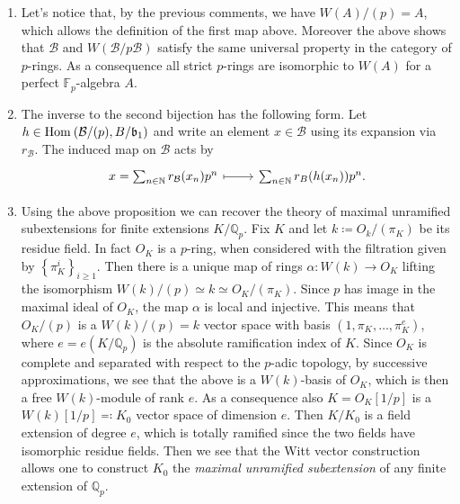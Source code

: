 \begin{rem}[]\leavevmode\vspace{-.2\baselineskip}
\begin{enumerate}
\item Let's notice that, by the previous comments, we have
	$W(A)/ (p) = A$, which allows the definition of the first map above.
	Moreover the above shows that $\mathcal{B}$ and $W(\mathcal{B}/p \mathcal{B})$
	satisfy the same universal property in the category of $p$-rings.
	As a consequence all strict $p$-rings are isomorphic to $W(A)$ for
	a perfect $\mathbb{F}_p$-algebra $A$.

\item The inverse to the second bijection has the following form.
	Let $h \in \operatorname{Hom}_{  } \left( \mathcal{B}/ (p), B/\mathfrak{b}_1 \right)$
	and write an element $x \in \mathcal{B}$ using its expansion via $r_{\mathcal{B}}$.
	The induced map on $\mathcal{B}$ acts by
	\begin{equation*}
	\begin{tikzcd}[row sep = 0ex
		,/tikz/column 1/.append style={anchor=base east}
		,/tikz/column 2/.append style={anchor=base west}]
		x = \sum_{n \in \mathbb{N} }^{  } r_{\mathcal{B}}(x_n) p^n 
		\arrow[r, "", mapsto] & 
		\sum_{n \in \mathbb{N} }^{  } r_B(h(x_n)) p^n
	.\end{tikzcd}
	\end{equation*} 

\item Using the above proposition we can recover the theory of maximal unramified
	subextensions for finite extensions $K/\mathbb{Q}_p$.
	Fix $K$ and let $k \coloneqq O_k/ (\pi_K)$ be its residue field.
	In fact $O_K$ is a $p$-ring, when considered with the filtration
	given by $\left\{ \pi_K^i \right\}_{i \geq 1}$.
	Then there is a unique map of rings $\alpha\colon W(k) \to O_K$
	lifting the isomorphism $W(k)/ (p) \simeq k \simeq O_K/ (\pi_K)$.
	Since $p$ has image in the maximal ideal of $O_K$,
	the map $\alpha$ is local and injective.
	This means that $O_K/ (p)$ is a $W(k)/ (p) = k$ vector space
	with basis $\left(1, \pi_K, \ldots, \pi_K^e\right)$,
	where $e = e(K/\mathbb{Q}_p)$ is the absolute ramification
	index of $K$.
	Since $O_K$ is complete and separated with respect to the $p$-adic topology,
	by successive approximations, we see that the above is a
	$W(k)$-basis of $O_K$, which is then a free $W(k)$-module
	of rank $e$.
	As a consequence also $K = O_K[1/p]$ is a $W(k)[1/p] \eqqcolon K_0$
	vector space of dimension $e$.
	Then $K/K_0$ is a field extension of degree $e$, which is totally ramified
	since the two fields have isomorphic residue fields.
	Then we see that the Witt vector construction allows one to
	construct $K_0$ the \emph{maximal unramified subextension} of any
	finite extension of $\mathbb{Q}_p$.


\end{enumerate}
\end{rem}
